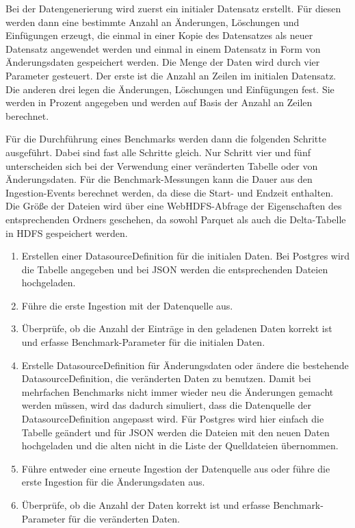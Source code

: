 Bei der Datengenerierung wird zuerst ein initialer Datensatz erstellt.
Für diesen werden dann eine bestimmte Anzahl an Änderungen, Löschungen und Einfügungen erzeugt, die einmal in einer Kopie des Datensatzes als neuer Datensatz angewendet werden und einmal in einem Datensatz in Form von Änderungsdaten gespeichert werden.
Die Menge der Daten wird durch vier Parameter gesteuert.
Der erste ist die Anzahl an Zeilen im initialen Datensatz.
Die anderen drei legen die Änderungen, Löschungen und Einfügungen fest.
Sie werden in Prozent angegeben und werden auf Basis der Anzahl an Zeilen berechnet.

Für die Durchführung eines Benchmarks werden dann die folgenden Schritte ausgeführt.
Dabei sind fast alle Schritte gleich.
Nur Schritt vier und fünf unterscheiden sich bei der Verwendung einer veränderten Tabelle oder von Änderungsdaten.
Für die Benchmark-Messungen kann die Dauer aus den Ingestion-Events berechnet werden, da diese die Start- und Endzeit enthalten.
Die Größe der Dateien wird über eine WebHDFS-Abfrage der Eigenschaften des entsprechenden Ordners geschehen, da sowohl Parquet als auch die Delta-Tabelle in HDFS gespeichert werden.
\begin{enumerate}
    \item Erstellen einer DatasourceDefinition für die initialen Daten.
    Bei Postgres wird die Tabelle angegeben und bei JSON werden die entsprechenden Dateien hochgeladen. 
    \item Führe die erste Ingestion mit der Datenquelle aus.
    \item Überprüfe, ob die Anzahl der Einträge in den geladenen Daten korrekt ist und erfasse Benchmark-Parameter für die initialen Daten.
    \item Erstelle DatasourceDefinition für Änderungsdaten oder ändere die bestehende DatasourceDefinition, die veränderten Daten zu benutzen.
    Damit bei mehrfachen Benchmarks nicht immer wieder neu die Änderungen gemacht werden müssen, wird das dadurch simuliert, dass die Datenquelle der DatasourceDefinition angepasst wird. Für Postgres wird hier einfach die Tabelle geändert und für JSON werden die Dateien mit den neuen Daten hochgeladen und die alten nicht in die Liste der Quelldateien übernommen.
    \item Führe entweder eine erneute Ingestion der Datenquelle aus oder führe die erste Ingestion für die Änderungsdaten aus.
    \item Überprüfe, ob die Anzahl der Daten korrekt ist und erfasse Benchmark-Parameter für die veränderten Daten.
\end{enumerate}

